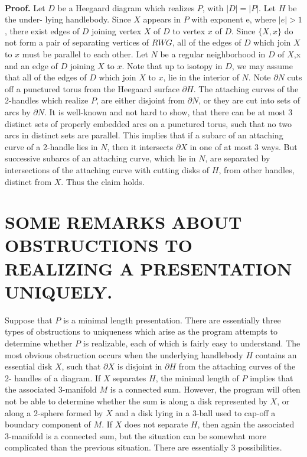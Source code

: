\documentclass[12pt]{amsart}
\newcommand{\pf}{\ \\ \noindent \textbf{Proof.} }
\begin{document}
\pf   Let $D$ be a Heegaard diagram which realizes $P$, with $|D| = |P|$. Let $H$ be the under-
        lying handlebody. Since $X$ appears in $P$ with exponent e, where $|e| > 1$, there exist edges
        of $D$ joining vertex $X$ of $D$ to vertex $x$ of $D$. Since $\{ X,x\}$ do not form a pair of
        separating vertices of $RWG$, all of the edges of $D$ which join $X$ to $x$ must be parallel
        to each other. Let $N$ be a regular neighborhood in $D$ of $X$,x and an edge of $D$ joining $X$
        to $x$. Note that up to isotopy in $D$, we may assume that all of the edges of $D$ which join
        $X$ to $x$, lie in the interior of $N$.
                Note $\partial N$ cuts off a punctured torus from the Heegaard surface $\partial H$. The attaching
        curves of the 2-handles which realize $P$, are either disjoint from $\partial N$, or they are cut
        into sets of arcs by $\partial N$. It is well-known and not hard to show, that there can be at
        most 3 distinct sets of properly embedded arcs on a punctured torus, such that no two
        arcs in distinct sets are parallel. This implies that if a subarc of an attaching curve
        of a 2-handle lies in $N$, then it intersects $\partial X$ in one of at most 3 ways. But successive
        subarcs of an attaching curve, which lie in $N$, are separated by intersections of the
        attaching curve with cutting disks of $H$, from other handles, distinct from $X$. Thus the
        claim holds.    


\section{SOME REMARKS ABOUT OBSTRUCTIONS TO REALIZING A PRESENTATION UNIQUELY.}
                        
                
                Suppose that $P$ is a minimal length presentation. There are essentially three types of
        obstructions to uniqueness which arise as the program attempts to determine whether $P$ is
        realizable, each of which is fairly easy to understand.
                The most obvious obstruction occurs when the underlying handlebody $H$ contains an
        essential disk $X$, such that $\partial X$ is disjoint in $\partial H$ from the attaching curves of the 2-
        handles of a diagram.
                If $X$ separates $H$, the minimal length of $P$ implies that the associated 3-manifold $M$ is
        a connected sum. However, the program will often not be able to determine whether the sum
        is along a disk represented by $X$, or along a 2-sphere formed by $X$ and a disk lying in a
        3-ball used to cap-off a boundary component of $M$.
                If $X$ does not separate $H$, then again the associated 3-manifold is a connected sum,
        but the situation can be somewhat more complicated than the previous situation. There
        are essentially 3 possibilities.
                
\end{document}
